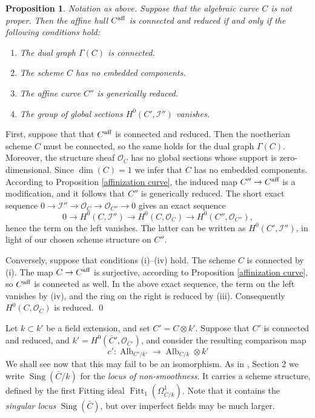 \documentclass[oneside, 12pt]{amsart}
\newcommand\mylabel[1]{\label{#1}\marginpar{\vspace{-1ex}\medskip\medskip\footnotesize \tt #1}}
\renewcommand\mylabel[1]{\label{#1}}
\newtheorem{proposition}[theorem]{Proposition}
\theoremstyle{definition}
\theoremstyle{remark}
\newcommand{\shI}{\mathscr{I}}
\newcommand{\aff}{\text{\rm aff}}
\newcommand{\Alb}{\operatorname{Alb}}
\newcommand{\Fitt}{\operatorname{Fitt}}
\newcommand{\lra}{\longrightarrow}
\renewcommand{\O}{\mathscr{O}}
\newcommand{\ra}{\rightarrow}
\newcommand{\Sing}{\operatorname{Sing}}
\begin{document}
\begin{proposition}
\mylabel{characterization affinization curve}
Notation as above. Suppose that the algebraic curve $C$ is not proper.
Then the affine hull $C^\aff$ is connected and reduced if and only if the following conditions hold:
\begin{enumerate}
\item The  dual graph $\Gamma(C)$ is connected.
\item The scheme $C$ has no embedded components.
\item The affine curve $C''$ is generically reduced.
\item The group  of global sections  $H^0(C',\shI'')$ vanishes.
\end{enumerate}
\end{proposition}

\proof
First, suppose that  that $C^\aff$ is connected and reduced. 
Then the noetherian scheme $C$ must be connected,   so the same holds for the dual graph $\Gamma(C)$.
Moreover, the structure sheaf $\O_C$ has no  global sections whose support is zero-dimensional.
Since $\dim(C)=1$ we infer that $C$ has no embedded components.
According to Proposition \ref{affinization curve}, the induced map $C''\ra C^\aff$ is a modification, and it follows
that $C''$ is generically reduced. The short exact sequence $0\ra\shI''\ra \O_C\ra\O_{C''}\ra 0$
gives an exact sequence
$$
0\lra H^0(C,\shI'')\lra H^0(C,\O_C)\lra H^0(C'',\O_{C''}),
$$
hence the term on the left vanishes. The latter can be written as  $H^0(C',\shI'')$, in light
of our chosen scheme structure on $C''$.

Conversely, suppose that conditions (i)--(iv) hold. The scheme $C$ is connected by (i).
The map $C\ra C^\aff$ is surjective, according to Proposition \ref{affinization curve}, so $C^\aff$ is connected as well.
In the above exact sequence, the term on the left vanishes by (iv), and the ring on the right is reduced by (iii).
Consequently  $H^0(C,\O_C)$ is reduced.
\qed

\medskip
Let $k\subset k'$ be a field extension, and set $C'=C\otimes k'$. Suppose that $C'$ is connected and reduced, and $k'=H^0(\bar{C}',\O_{\bar{C}'})$,
and consider the resulting comparison map 
\begin{equation}
\label{comparison curves}
c':\Alb_{C'/k'}\lra \Alb_{C/k}\otimes k'
\end{equation}
We shall see now that this may fail to be an  isomorphism.
As in \cite{Fanelli; Schroeer 2020b}, Section 2 we write $\Sing(\bar{C}/k)$ for the \emph{locus of non-smoothness}.
It carries a scheme structure, defined by the first Fitting ideal $\Fitt_1(\Omega^1_{\bar{C}/k})$. 
Note that it contains the \emph{singular locus} $\Sing(\bar{C})$, but over imperfect fields may be much larger.
\end{document}
